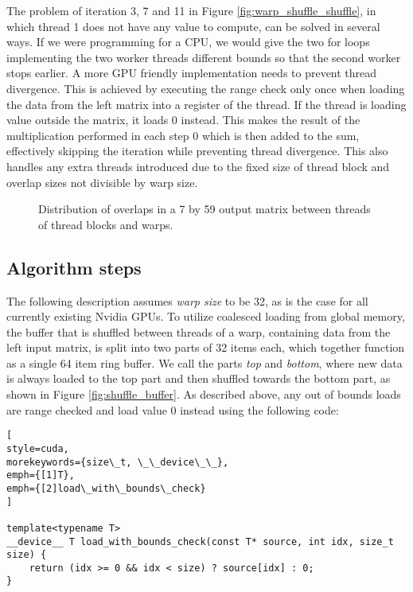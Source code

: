 The problem of iteration 3, 7 and 11 in Figure \ref{fig:warp_shuffle_shuffle}, in which thread 1 does not have any value to compute, can be solved in several ways. If we were programming for a CPU, we would give the two for loops implementing the two worker threads different bounds so that the second worker stops earlier. A more GPU friendly implementation needs to prevent thread divergence. This is achieved by executing the range check only once when loading the data from the left matrix into a register of the thread. If the thread is loading value outside the matrix, it loads 0 instead. This makes the result of the multiplication performed in each step 0 which is then added to the sum, effectively skipping the iteration while preventing thread divergence. This also handles any extra threads introduced due to the fixed size of thread block and overlap sizes not divisible by warp size.

\begin{figure}[ht]
	\centering
	\def\svgwidth{0.8\textwidth}
	
	\caption{Distribution of overlaps in a 7 by 59 output matrix between threads of thread blocks and warps.}
	\label{fig:warp_shuffle_simple_dist}
\end{figure}

\subsection{Algorithm steps}
\label{sec:simplified_warp_shuffle_steps}

The following description assumes \textit{warp size} to be 32, as is the case for all currently existing Nvidia GPUs. To utilize coalesced loading from global memory, the buffer that is shuffled between threads of a warp, containing data from the left input matrix, is split into two parts of 32 items each, which together function as a single 64 item ring buffer. We call the parts \textit{top} and \textit{bottom}, where new data is always loaded to the top part and then shuffled towards the bottom part, as shown in Figure \ref{fig:shuffle_buffer}. As described above, any out of bounds loads are range checked and load value 0 instead using the following code:
\begin{lstlisting}[
style=cuda,
morekeywords={size\_t, \_\_device\_\_},
emph={[1]T},
emph={[2]load\_with\_bounds\_check}
]

template<typename T>
__device__ T load_with_bounds_check(const T* source, int idx, size_t size) {
	return (idx >= 0 && idx < size) ? source[idx] : 0;
}
\end{lstlisting}


